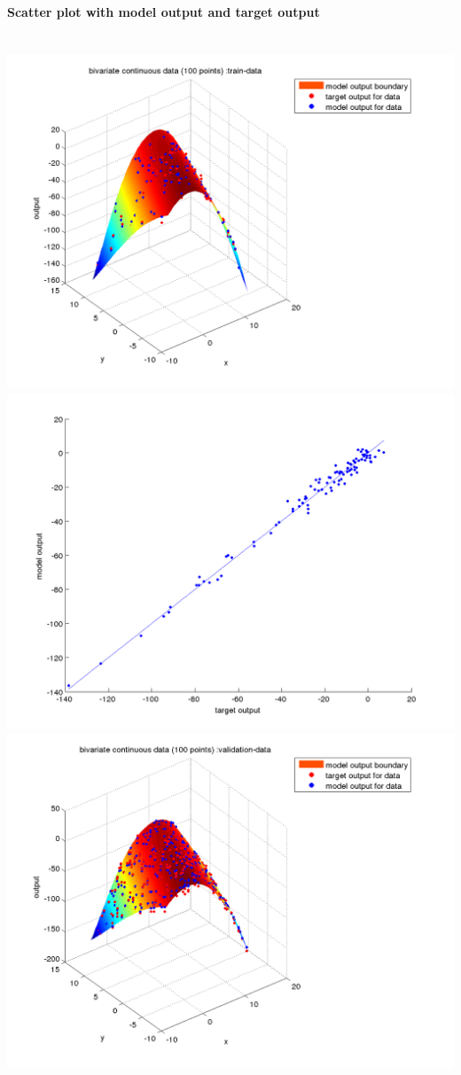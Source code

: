 \documentclass[fleqn]{article}
\newcommand{\myparagraph}[1]{\paragraph{#1}\mbox{}\\}
\begin{document}
\myparagraph{Scatter plot with model output and target output}
\includegraphics[scale=0.4]{./pics/bivariate100/_2_4/_2_4_epoch_100_train-data_scatter3d}
\includegraphics[scale=0.4]{./pics/bivariate100/_2_4/_2_4_epoch_100_train-data_scatter2d}
\includegraphics[scale=0.4]{./pics/bivariate100/_2_4/_2_4_epoch_100_validation-data_scatter3d}
\end{document}
